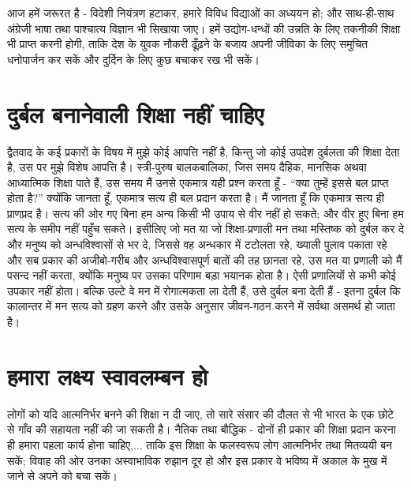 आज हमें जरूरत है - विदेशी नियंत्रण हटाकर, हमारे विविध विद्याओं का अध्ययन हो; और साथ-ही-साथ अंग्रेजी भाषा तथा पाश्चात्य विज्ञान भी सिखाया जाए। हमें उद्योग-धन्धों की उन्नति के लिए तकनीकी शिक्षा भी प्राप्त करनी होगी, ताकि देश के युवक नौकरी ढूँढ़ने के बजाय अपनी जीविका के लिए समुचित धनोपार्जन कर सकें और दुर्दिन के लिए कुछ बचाकर रख भी सकें।


\section*{दुर्बल बनानेवाली शिक्षा नहीं चाहिए}


द्वैतवाद के कई प्रकारों के विषय में मुझे कोई आपत्ति नहीं है, किन्तु जो कोई उपदेश दुर्बलता की शिक्षा देता है, उस पर मुझे विशेष आपत्ति है। स्त्री-पुरुष बालकबालिका, जिस समय दैहिक, मानसिक अथवा आध्यात्मिक शिक्षा पाते हैं, उस समय मैं उनसे एकमात्र यही प्रश्न करता हूँ - “क्या तुम्हें इससे बल प्राप्त होता है?” क्योंकि जानता हूँ, एकमात्र सत्य ही बल प्रदान करता है। मैं जानता हूँ कि एकमात्र सत्य ही प्राणप्रद है। सत्य की ओर गए बिना हम अन्य किसी भी उपाय से वीर नहीं हो सकते; और वीर हुए बिना हम सत्य के समीप नहीं पहुँच सकते। इसीलिए जो मत या जो शिक्षा-प्रणाली मन तथा मस्तिष्क को दुर्बल कर दे और मनुष्य को अन्धविश्वासों से भर दे, जिससे वह अन्धकार में टटोलता रहे, ख्याली पुलाव पकाता रहे और सब प्रकार की अजीबो-गरीब और अन्धविश्वासपूर्ण बातों की तह छानता रहे, उस मत या प्रणाली को मैं पसन्द नहीं करता, क्योंकि मनुष्य पर उसका परिणाम बड़ा भयानक होता है। ऐसी प्रणालियों से कभी कोई उपकार नहीं होता। बल्कि उल्टे वे मन में रोगात्मकता ला देती हैं, उसे दुर्बल बना देती हैं - इतना दुर्बल कि कालान्तर में मन सत्य को ग्रहण करने और उसके अनुसार जीवन-गठन करने में सर्वथा असमर्थ हो जाता है।


\section*{हमारा लक्ष्य स्वावलम्बन हो}


लोगों को यदि आत्मनिर्भर बनने की शिक्षा न दी जाए, तो सारे संसार की दौलत से भी भारत के एक छोटे से गाँव की सहायता नहीं की जा सकती है। नैतिक तथा बौद्धिक - दोनों ही प्रकार की शिक्षा प्रदान करना ही हमारा पहला कार्य होना चाहिए,... ताकि इस शिक्षा के फलस्वरूप लोग आत्मनिर्भर तथा मितव्ययी बन सकें; विवाह की ओर उनका अस्वाभाविक रुझान दूर हो और इस प्रकार वे भविष्य में अकाल के मुख में जाने से अपने को बचा सकें।


